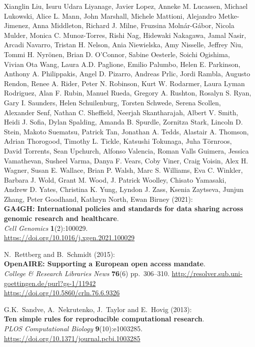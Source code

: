 \begin{thebibliography}{9}
Xianglin Liu, Isuru Udara Liyanage, Javier Lopez, Anneke M. Lucassen,
Michael Lukowski, Alice L. Mann, John Marshall, Michele Mattioni,
Alejandro Metke-Jimenez, Anna Middleton, Richard J. Milne, Fruzsina
Molnár-Gábor, Nicola Mulder, Monica C. Munoz-Torres, Rishi Nag, Hidewaki
Nakagawa, Jamal Nasir, Arcadi Navarro, Tristan H. Nelson, Ania
Niewielska, Amy Nisselle, Jeffrey Niu, Tommi H. Nyrönen, Brian D.
O'Connor, Sabine Oesterle, Soichi Ogishima, Vivian Ota Wang, Laura A.D.
Paglione, Emilio Palumbo, Helen E. Parkinson, Anthony A. Philippakis,
Angel D. Pizarro, Andreas Prlic, Jordi Rambla, Augusto Rendon, Renee A.
Rider, Peter N. Robinson, Kurt W. Rodarmer, Laura Lyman Rodriguez, Alan
F. Rubin, Manuel Rueda, Gregory A. Rushton, Rosalyn S. Ryan, Gary I.
Saunders, Helen Schuilenburg, Torsten Schwede, Serena Scollen, Alexander
Senf, Nathan C. Sheffield, Neerjah Skantharajah, Albert V. Smith, Heidi
J. Sofia, Dylan Spalding, Amanda B. Spurdle, Zornitza Stark, Lincoln D.
Stein, Makoto Suematsu, Patrick Tan, Jonathan A. Tedds, Alastair A.
Thomson, Adrian Thorogood, Timothy L. Tickle, Katsushi Tokunaga, Juha
Törnroos, David Torrents, Sean Upchurch, Alfonso Valencia, Roman Valls
Guimera, Jessica Vamathevan, Susheel Varma, Danya F. Vears, Coby Viner,
Craig Voisin, Alex H. Wagner, Susan E. Wallace, Brian P. Walsh, Marc S.
Williams, Eva C. Winkler, Barbara J. Wold, Grant M. Wood, J. Patrick
Woolley, Chisato Yamasaki, Andrew D. Yates, Christina K. Yung, Lyndon J.
Zass, Ksenia Zaytseva, Junjun Zhang, Peter Goodhand, Kathryn North, Ewan
Birney (2021):\\
\textbf{GA4GH: International policies and standards for data sharing
across genomic research and healthcare}.\\
\emph{Cell Genomics} \textbf{1}(2):100029.\\
\url{https://doi.org/10.1016/j.xgen.2021.100029}

N.~Rettberg and B.~Schmidt (2015):\\
\textbf{OpenAIRE: Supporting a European open access mandate}.\\
\emph{College \& Research Libraries News} \textbf{76}(6) pp.~306--310.
\url{http://resolver.sub.uni-goettingen.de/purl?gs-1/11942}\\
\url{https://doi.org/10.5860/crln.76.6.9326}

G.K.~Sandve, A.~Nekrutenko, J.~Taylor and E.~Hovig (2013):\\
\textbf{Ten simple rules for reproducible computational research}.\\
\emph{PLOS Computational Biology} \textbf{9}(10):e1003285.\\
\url{https://doi.org/10.1371/journal.pcbi.1003285}


\end{thebibliography}
